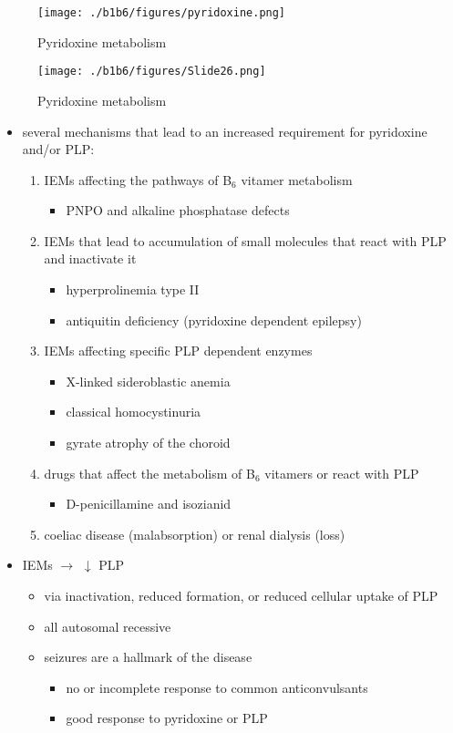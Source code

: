 \documentclass{scrartcl}
\begin{document}
\begin{figure}[htbp]
\centering
\texttt{[image: ./b1b6/figures/pyridoxine.png]}
\caption{\label{fig:org675184c}
Pyridoxine metabolism}
\end{figure}

\begin{figure}[htbp]
\centering
\texttt{[image: ./b1b6/figures/Slide26.png]}
\caption{\label{fig:org7fa5540}
Pyridoxine metabolism}
\end{figure}

\begin{itemize}
\item several mechanisms that lead to an increased requirement for
pyridoxine and/or PLP:
\begin{enumerate}
\item IEMs affecting the pathways of B\(_{\text{6}}\) vitamer metabolism
\begin{itemize}
\item PNPO and alkaline phosphatase defects
\end{itemize}
\item IEMs that lead to accumulation of small molecules that
react with PLP and inactivate it
\begin{itemize}
\item hyperprolinemia type II
\item antiquitin deficiency (pyridoxine dependent epilepsy)
\end{itemize}
\item IEMs affecting specific PLP dependent enzymes
\begin{itemize}
\item X-linked sideroblastic anemia
\item classical homocystinuria
\item gyrate atrophy of the choroid
\end{itemize}
\item drugs that affect the metabolism of B\(_{\text{6}}\) vitamers or react with PLP
\begin{itemize}
\item D-penicillamine and isozianid
\end{itemize}
\item coeliac disease (malabsorption) or renal dialysis (loss)
\end{enumerate}
\item IEMs \(\to\) \(\downarrow\) PLP
\begin{itemize}
\item via inactivation, reduced formation, or reduced cellular uptake of
PLP
\item all autosomal recessive
\item seizures are a hallmark of the disease
\begin{itemize}
\item no or incomplete response to common anticonvulsants
\item good response to pyridoxine or PLP
\end{itemize}
\end{itemize}
\end{itemize}
\end{document}
